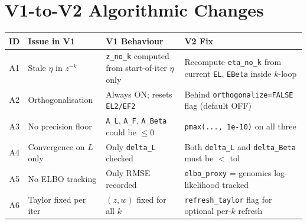 \documentclass[11pt]{article}
\newcommand{\coderef}[1]{{\color{blue!70!black}\texttt{#1}}}
\begin{document}
\section{V1-to-V2 Algorithmic Changes}\label{sec:v1-v2}

\begin{center}
\small
\begin{tabular}{clp{5cm}p{5cm}}
\toprule
\textbf{ID} & \textbf{Issue in V1} & \textbf{V1 Behaviour} & \textbf{V2 Fix} \\
\midrule
A1 & Stale $\eta$ in $z^{-k}$ & \coderef{z\_no\_k} computed from
     start-of-iter $\eta$ only &
     Recompute \coderef{eta\_no\_k} from current \coderef{EL}, \coderef{EBeta}
     inside $k$-loop \\
A2 & Orthogonalisation & Always ON; resets \coderef{EL2/EF2} &
     Behind \coderef{orthogonalize=FALSE} flag (default OFF) \\
A3 & No precision floor & \coderef{A\_L}, \coderef{A\_F}, \coderef{A\_Beta}
     could be $\le 0$ & \coderef{pmax(..., 1e-10)} on all three \\
A4 & Convergence on $L$ only & Only \coderef{delta\_L} checked &
     Both \coderef{delta\_L} and \coderef{delta\_Beta} must be $<$ tol \\
A5 & No ELBO tracking & Only RMSE recorded &
     \coderef{elbo\_proxy} = genomics log-likelihood tracked \\
A6 & Taylor fixed per iter & $(z, w)$ fixed for all $k$ &
     \coderef{refresh\_taylor} flag for optional per-$k$ refresh \\
\bottomrule
\end{tabular}
\end{center}
\end{document}
